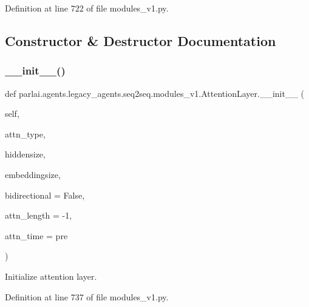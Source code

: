 Definition at line 722 of file modules\+\_\+v1.\+py.



\subsection{Constructor \& Destructor Documentation}
\mbox{\label{classparlai_1_1agents_1_1legacy__agents_1_1seq2seq_1_1modules__v1_1_1AttentionLayer_aed77232760e470a547c8c4ec68e529c7}} 
\subsubsection{\texorpdfstring{\+\_\+\+\_\+init\+\_\+\+\_\+()}{\_\_init\_\_()}}
{\footnotesize\ttfamily def parlai.\+agents.\+legacy\+\_\+agents.\+seq2seq.\+modules\+\_\+v1.\+Attention\+Layer.\+\_\+\+\_\+init\+\_\+\+\_\+ (\begin{DoxyParamCaption}\item[{}]{self,  }\item[{}]{attn\+\_\+type,  }\item[{}]{hiddensize,  }\item[{}]{embeddingsize,  }\item[{}]{bidirectional = {\ttfamily False},  }\item[{}]{attn\+\_\+length = {\ttfamily -\/1},  }\item[{}]{attn\+\_\+time = {\ttfamily \textquotesingle{}pre\textquotesingle{}} }\end{DoxyParamCaption})}

\begin{DoxyVerb}Initialize attention layer.
\end{DoxyVerb}
 

Definition at line 737 of file modules\+\_\+v1.\+py.


